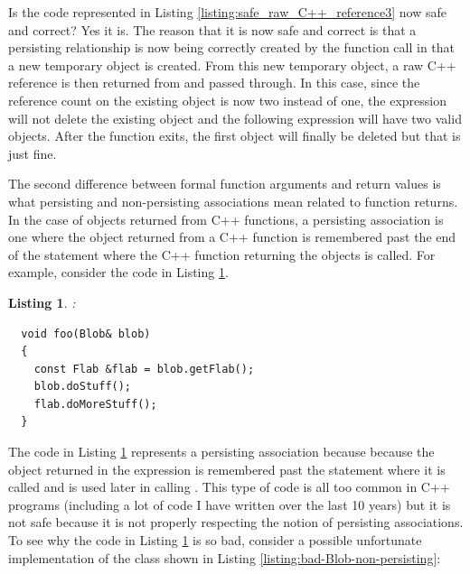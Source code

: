 \documentclass[pdf,ps2pdf,11pt]{SANDreport}
\newtheorem{listing}{Listing}
\begin{document}
Is the code represented in Listing
{}\ref{listing:safe_raw_C++_reference3} now safe and correct?  Yes it
is.  The reason that it is now safe and correct is that a persisting
relationship is now being correctly created by the function call
{} in that a new temporary {}
object is created.  From this new temporary {}
object, a raw C++ reference is then returned from
{} and passed through.  In this case, since
the reference count on the existing {} object is now two
instead of one, the expression {} will not
delete the existing {} object and the following
expression {} will have two valid
{} objects.  After the function
{} exits, the first
{} object will finally be deleted but that is just fine.

The second difference between formal function arguments and return
values is what persisting and non-persisting associations mean related
to function returns.  In the case of objects returned from C++
functions, a persisting association is one where the object returned
from a C++ function is remembered past the end of the statement where
the C++ function returning the objects is called.  For example,
consider the code in Listing {}\ref{listing:persisting-func-return-1}.

\begin{listing}:\\
\label{listing:persisting-func-return-1}
{\small\begin{verbatim}
  void foo(Blob& blob)
  {
    const Flab &flab = blob.getFlab();
    blob.doStuff();
    flab.doMoreStuff();
  }
\end{verbatim}}
\end{listing}

The code in Listing {}\ref{listing:persisting-func-return-1}
represents a persisting association because because the
{} object returned in the expression {} is remembered past the statement where it is
called and is used later in calling {}.
This type of code is all too common in C++ programs (including a lot
of code I have written over the last 10 years) but it is not safe
because it is not properly respecting the notion of persisting
associations.  To see why the code in Listing
{}\ref{listing:persisting-func-return-1} is so bad, consider a
possible unfortunate implementation of the {} class shown
in Listing {}\ref{listing:bad-Blob-non-persisting}:
\end{document}
